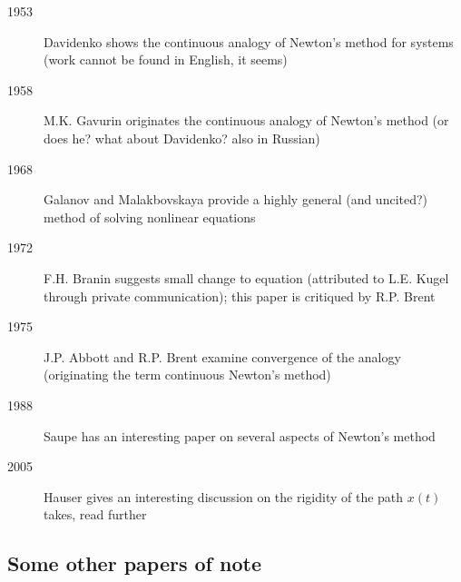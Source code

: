 \documentclass{book}
\begin{document}
\begin{description}
\item[1953] Davidenko \cite{davidenko1953new} shows the continuous analogy of Newton's method for systems (work cannot be found in English, it seems)
\item[1958] M.K. Gavurin \cite{Gavurin1958} originates the continuous analogy of Newton's method (or does he? what about Davidenko? also in Russian)
\item[1968] Galanov and Malakbovskaya provide a highly general (and uncited?) method of solving nonlinear equations \cite{galanov1968realization}
\item[1972] F.H. Branin \cite{branin1972widely} suggests small change to equation (attributed to L.E. Kugel through private communication); this paper is critiqued by R.P. Brent \cite{brent1972davidenko}
\item[1975] J.P. Abbott and R.P. Brent \cite{abbott1975fast} examine convergence of the analogy (originating the term continuous Newton's method)
\item[1988] Saupe \cite{saupe1988discrete} has an interesting paper on several aspects of Newton's method
\item[2005] Hauser \cite{hauser2005continuous} gives an interesting discussion on the rigidity of the path $x(t)$ takes, read further
\end{description}

\subsection{Some other papers of note}
\end{document}
